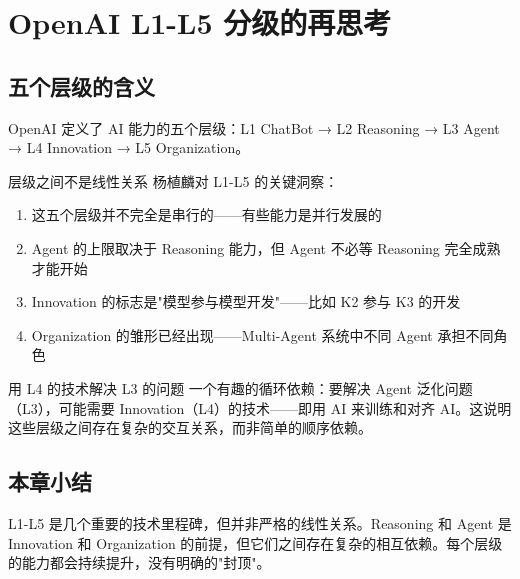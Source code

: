 \section{OpenAI L1-L5 分级的再思考}

\subsection{五个层级的含义}

OpenAI 定义了 AI 能力的五个层级：L1 ChatBot → L2 Reasoning → L3 Agent → L4 Innovation → L5 Organization。

\begin{importantbox}{层级之间不是线性关系}
杨植麟对 L1-L5 的关键洞察：
\begin{enumerate}
    \item 这五个层级并不完全是串行的——有些能力是并行发展的
    \item Agent 的上限取决于 Reasoning 能力，但 Agent 不必等 Reasoning 完全成熟才能开始
    \item Innovation 的标志是"模型参与模型开发"——比如 K2 参与 K3 的开发
    \item Organization 的雏形已经出现——Multi-Agent 系统中不同 Agent 承担不同角色
\end{enumerate}
\end{importantbox}

\begin{knowledgebox}{用 L4 的技术解决 L3 的问题}
一个有趣的循环依赖：要解决 Agent 泛化问题（L3），可能需要 Innovation（L4）的技术——即用 AI 来训练和对齐 AI。这说明这些层级之间存在复杂的交互关系，而非简单的顺序依赖。
\end{knowledgebox}

\subsection{本章小结}

L1-L5 是几个重要的技术里程碑，但并非严格的线性关系。Reasoning 和 Agent 是 Innovation 和 Organization 的前提，但它们之间存在复杂的相互依赖。每个层级的能力都会持续提升，没有明确的"封顶"。


